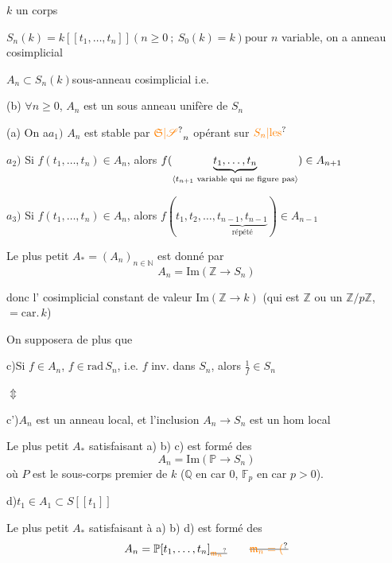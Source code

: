 $k$ un  corps

$S_n(k)=k[[t_1,\ldots,t_n]]$\qquad $(n\geq0\ ;\ S_0(k)=k)$\qquad pour $n$ variable, on a anneau cosimplicial

$A_n\subset S_n(k)$\qquad sous-anneau cosimplicial i.e.

\margin{$\Big\downarrow$}%
(b) $\forall n\geq0$, $A_n$ est un sous anneau unifère de $S_n$

(a) On a\quad $a_1)$ $A_n$ est stable par $\unsure{\mathfrak S|\mathscr S}_n$ opérant sur $\unsure{S_n|\text{les}}$

\hspace*{2em}$a_2)$ Si $f(t_1,\ldots,t_n)\in A_n$, alors $f(\underbrace{t_1,\ldots,t_n}_{\text{\inserted{$t_{n+1}$ variable qui ne figure pas}}})\in A_{n+1}$

\hspace*{2em}$a_3)$ Si $f(t_1,\ldots,t_n)\in A_n$, alors $f(t_1,t_2,\ldots,\underbrace{t_{n-1},t_{n-1}}_{\text{répété}})\in A_{n-1}$

Le plus petit $A_*=(A_n)_{n\in\mathbb N}$   est donné par 
\[
 A_n=\mathrm{Im}(\mathbb Z\to S_n)
\]

donc l' cosimplicial constant de valeur $\mathrm{Im}(\mathbb Z\to k)$ (qui est $\mathbb Z$ ou un $\mathbb Z/p\mathbb Z$,  $=\mathrm{car}.\,k$)

On supposera de plus que

c)\qquad Si $f\in A_n$,  $f\in\mathrm{rad}\, S_n$, i.e.  $f$ inv. dans $S_n$, alors $\frac1f\in S_n$

$\Updownarrow$

c')\qquad $A_n$ est un anneau local, et l'inclusion $A_n\to S_n$ est un hom local

Le plus petit $A_*$ satisfaisant a) b) c) est formé des
\[
 A_n=\mathrm{Im}(\mathbb P\to S_n)
\]
où $P$ est le sous-corps premier de $k$ ($\mathbb Q$ en car $0$, $\mathbb F_p$ en car $p>0$).

d)\qquad $t_1\in A_1\subset S[[t_1]]$

Le plus petit $A_*$ satisfaisant à a) b) d)  est formé des
\[
 A_n=\mathbb P[t_1,\ldots,t_n]_{\deleted{\unsure{\mathfrak m_n}}}\qquad
 \deleted{\unsure{\mathfrak m_n=(}}
\]

